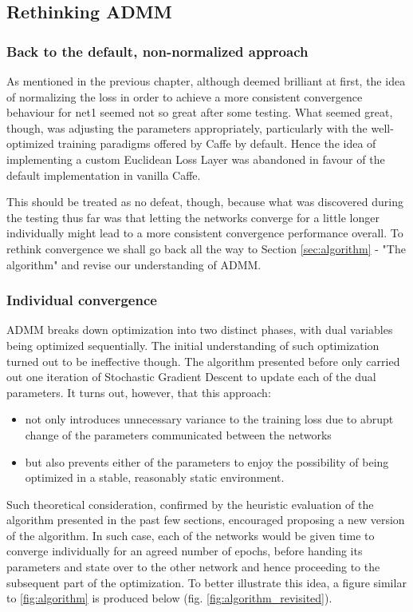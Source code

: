 \documentclass[a4paper, 12pt]{article}
\numberwithin{equation}{section}
\begin{document}
	\subsection{Rethinking ADMM}

	\subsubsection{Back to the default, non-normalized approach}
	
	As mentioned in the previous chapter, although deemed brilliant at first, the idea of normalizing the loss in order to achieve a more consistent convergence behaviour for net1 seemed not so great after some testing. What seemed great, though, was adjusting the parameters appropriately, particularly with the well-optimized training paradigms offered by Caffe by default. Hence the idea of implementing a custom Euclidean Loss Layer was abandoned in favour of the default implementation in vanilla Caffe.
	
	This should be treated as no defeat, though, because what was discovered during the testing thus far was that letting the networks converge for a little longer individually might lead to a more consistent convergence performance overall. To rethink convergence we shall go back all the way to Section \ref{sec:algorithm} - "The algorithm" and revise our understanding of ADMM.
	
	\subsubsection{Individual convergence}
	
	ADMM breaks down optimization into two distinct phases, with dual variables being optimized sequentially. The initial understanding of such optimization turned out to be ineffective though. The algorithm presented before only carried out one iteration of Stochastic Gradient Descent to update each of the dual parameters. It turns out, however, that this approach:
	\begin{itemize}
		\item not only introduces unnecessary variance to the training loss due to abrupt change of the parameters communicated between the networks
		\item but also prevents either of the parameters to enjoy the possibility of being optimized in a stable, reasonably static environment.
	\end{itemize}

	Such theoretical consideration, confirmed by the heuristic evaluation of the algorithm presented in the past few sections, encouraged proposing a new version of the algorithm. In such case, each of the networks would be given time to converge individually for an agreed number of epochs, before handing its parameters and state over to the other network and hence proceeding to the subsequent part of the optimization. To better illustrate this idea, a figure similar to \ref{fig:algorithm} is produced below (fig. \ref{fig:algorithm_revisited}).
	
\end{document}
